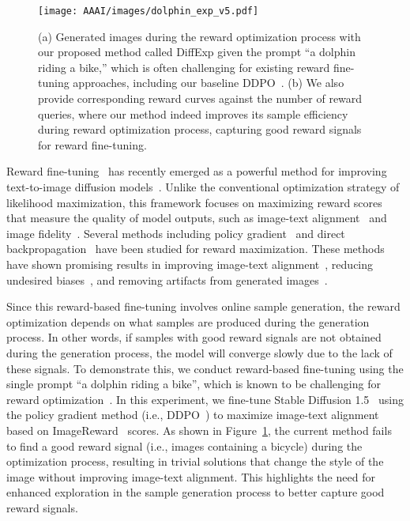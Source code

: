 \begin{figure}[!t]
  \centering
  \texttt{[image: AAAI/images/dolphin\_exp\_v5.pdf]}
  \caption{
  (a) Generated images during the reward optimization process with our proposed method called DiffExp given the prompt ``a dolphin riding a bike,'' which is often challenging for existing reward fine-tuning approaches, including our baseline DDPO~\cite{ddpo}. (b) We also provide corresponding reward curves against the number of reward queries, where our method indeed improves its sample efficiency during reward optimization process, capturing good reward signals for reward fine-tuning. 
  }
  \label{fig:dolphin}
\end{figure}

Reward fine-tuning~\cite{ddpo,dpok,draft,alignprop, align_t2i} has recently emerged as a powerful method for improving text-to-image diffusion models~\cite{sdxl,stable_diffusion}.
Unlike the conventional optimization strategy of likelihood maximization, this framework focuses on maximizing reward scores that measure the quality of model outputs, such as image-text alignment~\cite{pickscore,align_t2i,hps,imagereward} and image fidelity~\cite{aesthetic}.
Several methods including policy gradient~\cite{ddpo,dpok} and direct backpropagation~\cite{draft,alignprop} have been studied for reward maximization.
These methods have shown promising results in improving image-text alignment~\cite{ddpo,dpok}, reducing undesired biases~\cite{dpok}, and removing artifacts from generated images~\cite{hps}. 

Since this reward-based fine-tuning involves online sample generation, the reward optimization depends on what samples are produced during the generation process. 
In other words, if samples with good reward signals are not obtained during the generation process, the model will converge slowly due to the lack of these signals. 
To demonstrate this, we conduct reward-based fine-tuning using the single prompt ``a dolphin riding a bike'', which is known to be challenging for reward optimization~\cite{ddpo}.
In this experiment, we fine-tune Stable Diffusion 1.5~\cite{stable_diffusion} using the policy gradient method (i.e., DDPO~\cite{ddpo}) to maximize image-text alignment based on ImageReward~\cite{imagereward} scores. 
As shown in Figure~\ref{fig:dolphin}, the current method fails to find a good reward signal (i.e., images containing a bicycle) during the optimization process, resulting in trivial solutions that change the style of the image without improving image-text alignment.
This highlights the need for enhanced exploration in the sample generation process to better capture good reward signals.


